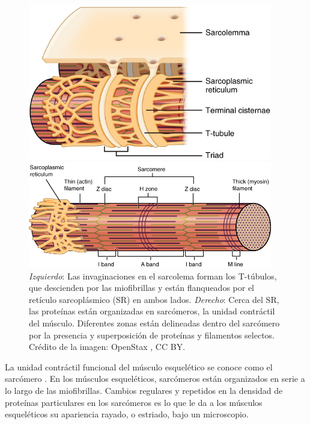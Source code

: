 \documentclass[12pt]{article}
\begin{document}
\begin{figure}[h!]
\begin{minipage}{.45\textwidth}
\centering
\includegraphics[width=0.95\textwidth]{figures/T-tubule.jpg}
\end{minipage}%
\begin{minipage}{.52\textwidth}
\centering
\includegraphics[width=0.95\textwidth]{figures/SRsarcomere.png}
\end{minipage}
\caption{\textit{Izquierdo}: Las invaginaciones en el sarcolema forman
  los T-túbulos, que descienden por las miofibrillas y están
  flanqueados por el retículo sarcoplásmico (SR) en ambos lados.
  \textit{Derecho}: Cerca del SR, las proteínas están organizadas en
  sarcómeros, la unidad contráctil del músculo. Diferentes zonas
  están delineadas dentro del sarcómero por la presencia y
  superposición de proteínas y filamentos selectos. Crédito de
  la imagen: OpenStax \cite{openStax2016muscle}, CC BY.}
\label{fig:ttubules}
\end{figure}

La unidad contráctil funcional del músculo esquelético se conoce como
el sarcómero \cite{openStax2016muscle}. En los músculos esqueléticos,
sarcómeros están organizados en serie a lo largo de las
miofibrillas. Cambios regulares y repetidos en la densidad de proteínas
particulares en los sarcómeros es lo que le da a los músculos
esqueléticos su apariencia rayado, o estriado, bajo un microscopio.
\end{document}
